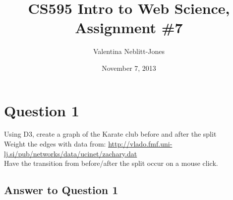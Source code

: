 \documentclass{article}
\begin{document}
\title{CS595 Intro to Web Science, Assignment \#7}
\author{Valentina Neblitt-Jones}
\date{November 7, 2013}
\maketitle



\section*{Question 1}

Using D3, create a graph of the Karate club before and after the split \\

Weight the edges with data from: \url{http://vlado.fmf.uni-lj.si/pub/networks/data/ucinet/zachary.dat} \\

Have the transition from before/after the split occur on a mouse click.  \\


\subsection*{Answer to Question 1}




\end{document}
